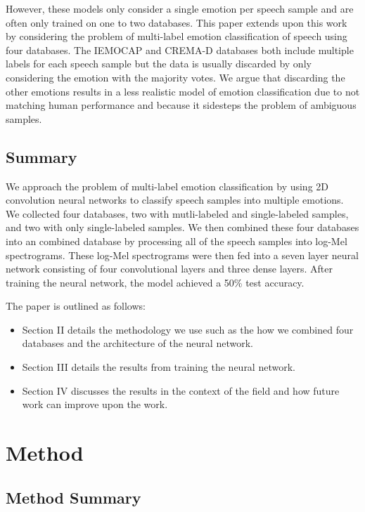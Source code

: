 \documentclass[conference]{IEEEtran}
\begin{document}
However, these models only consider a single emotion per speech sample and are often only trained on one to two databases. This paper extends upon this work by considering the problem of multi-label emotion classification of speech using four databases. The IEMOCAP and CREMA-D databases both include multiple labels for each speech sample but the data is usually discarded by only considering the emotion with the majority votes. We argue that discarding the other emotions results in a less realistic model of emotion classification due to not matching human performance and because it sidesteps the problem of ambiguous samples.

\subsection{Summary}

We approach the problem of multi-label emotion classification by using 2D convolution neural networks to classify speech samples into multiple emotions. We collected four databases, two with mutli-labeled and single-labeled samples, and two with only single-labeled samples. We then combined these four databases into an combined database by processing all of the speech samples into log-Mel spectrograms. These log-Mel spectrograms were then fed into a seven layer neural network consisting of four convolutional layers and three dense layers. After training the neural network, the model achieved a 50\% test accuracy.

The paper is outlined as follows:
\begin{itemize}
	\item Section II details the methodology we use such as the how we combined four databases and the architecture of the neural network.
	\item Section III details the results from training the neural network.
	\item Section IV discusses the results in the context of the field and how future work can improve upon the work.
\end{itemize}

\section{Method}

\subsection{Method Summary}
\end{document}
